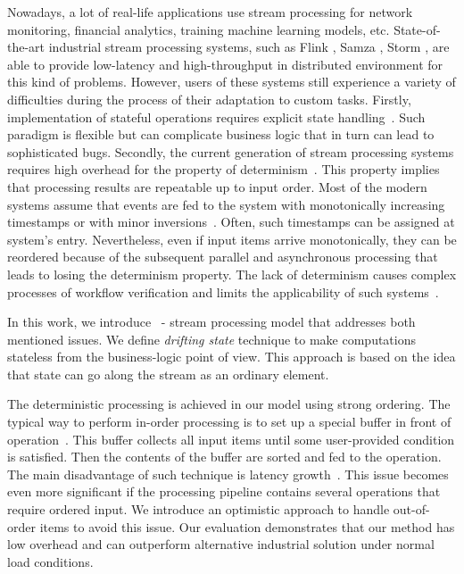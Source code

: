
\label {fs-intro-seciton}

Nowadays, a lot of real-life applications use stream processing for network monitoring, financial analytics, training machine learning models, etc. State-of-the-art industrial stream processing systems, such as Flink \cite{carbone2015apache}, Samza \cite{Noghabi:2017:SSS:3137765.3137770}, Storm \cite{apache:storm}, are able to provide low-latency and high-throughput in distributed environment for this kind of problems. However, users of these systems still experience a variety of difficulties during the process of their adaptation to custom tasks. Firstly, implementation of stateful operations requires explicit state handling~\cite{apache:flink:state, apache:storm:state}. Such paradigm is flexible but can complicate business logic that in turn can lead to sophisticated bugs. Secondly, the current generation of stream processing systems requires high overhead for the property of determinism~\cite{Zacheilas:2017:MDS:3093742.3093921}. This property implies that processing results are repeatable up to input order. Most of the modern systems assume that events are fed to the system with monotonically increasing timestamps or with minor inversions~\cite{Wei:2009:SSO:1559845.1559973}. Often, such timestamps can be assigned at system's entry. Nevertheless, even if input items arrive monotonically, they can be reordered because of the subsequent parallel and asynchronous processing that leads to losing the determinism property. The lack of determinism causes complex processes of workflow verification and limits the applicability of such systems~\cite{Stonebraker:2005:RRS:1107499.1107504, Zacheilas:2017:MDS:3093742.3093921}.

In this work, we introduce \FlameStream\ - stream processing model that addresses both mentioned issues. We define {\it drifting state} technique to make computations stateless from the business-logic point of view. This approach is based on the idea that state can go along the stream as an ordinary element. 

The deterministic processing is achieved in our model using strong ordering. The typical way to perform in-order processing is to set up a special buffer in front of operation~\cite{Li:2008:OPN:1453856.1453890}. This buffer collects all input items until some user-provided condition is satisfied. Then the contents of the buffer are sorted and fed to the operation. The main disadvantage of such technique is latency growth~\cite{Zacheilas:2017:MDS:3093742.3093921}. This issue becomes even more significant if the processing pipeline contains several operations that require ordered input. We introduce an optimistic approach to handle out-of-order items to avoid this issue. Our evaluation demonstrates that our method has low overhead and can outperform alternative industrial solution under normal load conditions.

